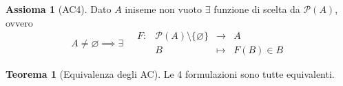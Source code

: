 \documentclass[a4paper,10pt]{article}
\theoremstyle{definition}
\theoremstyle{indentdefinition}
\theoremstyle{indentpostulate}
\newtheorem{axiom}{Assioma}[section]
\theoremstyle{indenttheorem}
\newtheorem{thm}{Teorema}[section]
\theoremstyle{myremark}
\theoremstyle{indentgeneral}
\newenvironment{myboxed} 
{\noindent\begin{lrbox}{\mybox}\begin{minipage}{\textwidth}}
{\end{minipage}\end{lrbox}\fbox{\usebox{\mybox}}}
\begin{document}
\begin{axiom}[AC4]\label{axm-ac4}
    Dato $A$ iniseme non vuoto $\exists$ funzione di scelta da $\mathscr{P}(A)$, ovvero
    $$A\ne\varnothing\implies\exists\quad \boxed{\begin{array}{cccc}
       F: & \mathscr{P}(A)\setminus\{\varnothing\}& \to & A  \\
         & B  & \mapsto & F(B)\in B
    \end{array}}$$
\end{axiom}

\begin{myboxed}
    \begin{thm}[Equivalenza degli AC]
        Le 4 formulazioni sono tutte equivalenti.
    \end{thm}
\end{myboxed}
\end{document}
